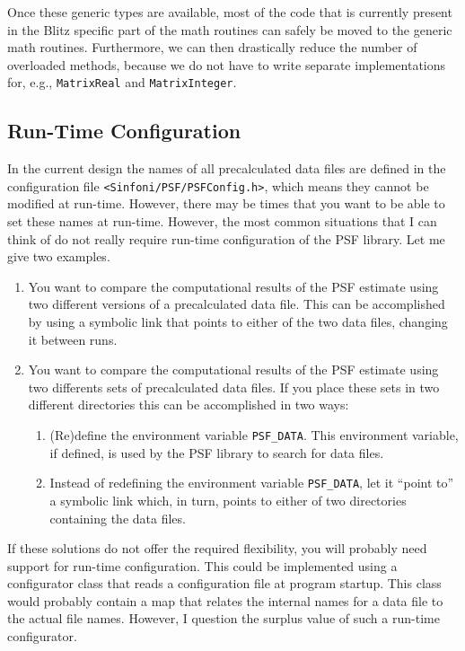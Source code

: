 \documentclass[a4paper]{article}
\begin{document}
Once these generic types are available, most of the code that is currently
present in the Blitz specific part of the math routines can safely be moved to
the generic math routines. Furthermore, we can then drastically reduce the
number of overloaded methods, because we do not have to write separate
implementations for, e.g., \verb|MatrixReal| and \verb|MatrixInteger|. 


\subsection{Run-Time Configuration}
\label{subsec:future-config}
In the current design the names of all precalculated data files are defined in
the configuration file \verb|<Sinfoni/PSF/PSFConfig.h>|, which means they
cannot be modified at run-time. However, there may be times that you want to
be able to set these names at run-time. However, the most common situations
that I can think of do not really require run-time configuration of the PSF
library. Let me give two examples.

\begin{enumerate}
\item You want to compare the computational results of the PSF estimate using
two different versions of a precalculated data file. This can be accomplished
by using a symbolic link that points to either of the two data files, changing
it between runs.
\item You want to compare the computational results of the PSF estimate using
two differents sets of precalculated data files. If you place these sets in
two different directories this can be accomplished in two ways:
\begin{enumerate}
\item (Re)define the environment variable \verb|PSF_DATA|. This environment
variable, if defined, is used by the PSF library to search for data files.
\item Instead of redefining the environment variable \verb|PSF_DATA|, let it
``point to'' a symbolic link which, in turn, points to either of two
directories containing the data files.
\end{enumerate}
\end{enumerate}

If these solutions do not offer the required flexibility, you will probably
need support for run-time configuration. This could be implemented using a
configurator class that reads a configuration file at program startup. This
class would probably contain a map that relates the internal names for a data
file to the actual file names. However, I question the surplus value of such a
run-time configurator.
\end{document}
